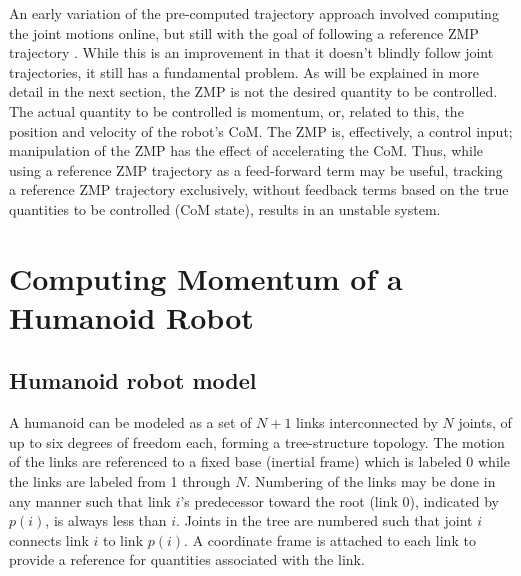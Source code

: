 \documentclass{llncs}
\begin{document}
An early variation of the pre-computed trajectory approach involved computing the joint motions 
online, but still with the goal of following a reference ZMP trajectory \cite{nishiwaki2002online, 
kagami2002fast, sugihar2002real}.  
While this is an improvement in that it doesn't blindly follow
joint trajectories, it still has a fundamental problem.
As will be explained in more detail in the next section, the ZMP is not the desired quantity to be
controlled. 
The actual quantity to be controlled is momentum, or, related to this, the position and velocity of the 
robot's CoM.
The ZMP is, effectively, a control input;  manipulation of the ZMP has the effect of accelerating the CoM.
Thus, while using a reference ZMP trajectory as a feed-forward term may be useful,
tracking a reference ZMP trajectory exclusively, without feedback terms based on the true
quantities to be controlled (CoM state), results in an unstable system.



\section{Computing Momentum of a Humanoid Robot}


\subsection{Humanoid robot model}
\label{sn}

A humanoid can be modeled as a set of $N+1$ links interconnected by $N$ joints,
of up to six degrees of freedom each, forming a tree-structure topology.
The motion of the links are referenced to a fixed base (inertial frame)
which is labeled 0 while the links are labeled from 1 through $N$.
Numbering of the links may be done in any manner such that link $i$'s
predecessor toward the root (link 0), indicated by $p(i)$, is always
less than $i$.  Joints in the tree are numbered such that joint $i$
connects link $i$ to link $p(i)$.  A coordinate frame is attached to each
link to provide a reference for quantities associated with the link.
\end{document}
